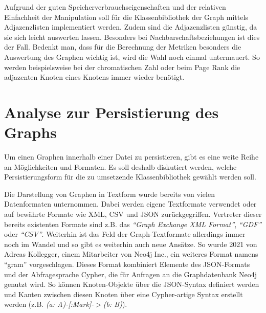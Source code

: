 \documentclass[a4paper,12pt,ngerman,chapterprefix=false,listof=totoc,bibliography=totoc]{scrreprt}
\begin{document}
{{{Aufgrund der guten Speicherverbrauchseigenschaften und der relativen Einfachheit der Manipulation soll für die Klassenbibliothek der Graph mittels Adjazenzlisten implementiert werden. Zudem sind die Adjazenzlisten günstig, da sie sich leicht auswerten lassen. Besonders bei Nachbarschaftsbeziehungen ist dies der Fall. Bedenkt man, dass für die Berechnung der Metriken besonders die Auswertung des Graphen wichtig ist, wird die Wahl noch einmal untermauert. So werden beispielsweise bei der chromatischen Zahl oder beim Page Rank die adjazenten Knoten eines Knotens immer wieder benötigt.
}

\section{Analyse zur Persistierung des Graphs}
{
Um einen Graphen innerhalb einer Datei zu persistieren, gibt es eine weite Reihe an Möglichkeiten und Formaten. Es soll deshalb diskutiert werden, welche Persistierungsform für die zu umsetzende Klassenbibliothek gewählt werden soll.

Die Darstellung von Graphen in Textform wurde bereits von vielen Datenformaten unternommen. Dabei werden eigene Textformate verwendet oder auf bewährte Formate wie XML, CSV und JSON zurückgegriffen. Vertreter dieser bereits existenten Formate sind z.B. das \textit{"`Graph Exchange XML Format"'}, \textit{"`GDF"'} oder \textit{"`CSV"'}. \cite{gephi_supported_2017} Weiterhin ist das Feld der Graph-Textformate allerdings immer noch im Wandel und so gibt es weiterhin auch neue Ansätze. So wurde 2021 von Adreas Kollegger, einem Mitarbeiter von Neo4j Inc., ein weiteres Format namens "`gram"' vorgeschlagen. Dieses Format kombiniert Elemente des JSON-Formats und der Abfragesprache Cypher, die für Anfragen an die Graphdatenbank Neo4j genutzt wird. So können Knoten-Objekte über die JSON-Syntax definiert werden und Kanten zwischen diesen Knoten über eine Cypher-artige Syntax erstellt werden (z.B. \textit{(a: A)-[:Mark]-\(>\)(b: B)}). \cite{kollegger_gram_2021}

}}}
\end{document}
